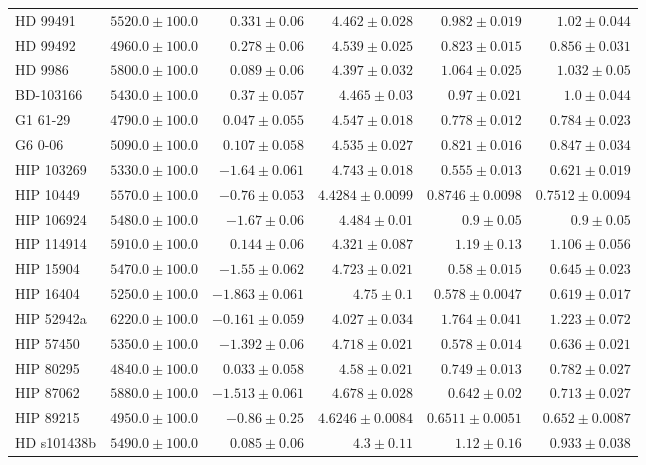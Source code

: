 \begin{longtable*}{lrrrrr}
HD 99491 & $5520.0\pm 100.0$ & $0.331\pm 0.06$ & $4.462\pm 0.028$ & $0.982\pm 0.019$ & $1.02\pm 0.044$ \\ 
HD 99492 & $4960.0\pm 100.0$ & $0.278\pm 0.06$ & $4.539\pm 0.025$ & $0.823\pm 0.015$ & $0.856\pm 0.031$ \\ 
HD 9986 & $5800.0\pm 100.0$ & $0.089\pm 0.06$ & $4.397\pm 0.032$ & $1.064\pm 0.025$ & $1.032\pm 0.05$ \\ 
BD-103166 & $5430.0\pm 100.0$ & $0.37\pm 0.057$ & $4.465\pm 0.03$ & $0.97\pm 0.021$ & $1.0\pm 0.044$ \\ 
G1 61-29 & $4790.0\pm 100.0$ & $0.047\pm 0.055$ & $4.547\pm 0.018$ & $0.778\pm 0.012$ & $0.784\pm 0.023$ \\ 
G6 0-06 & $5090.0\pm 100.0$ & $0.107\pm 0.058$ & $4.535\pm 0.027$ & $0.821\pm 0.016$ & $0.847\pm 0.034$ \\ 
HIP 103269 & $5330.0\pm 100.0$ & $-1.64\pm 0.061$ & $4.743\pm 0.018$ & $0.555\pm 0.013$ & $0.621\pm 0.019$ \\ 
HIP 10449 & $5570.0\pm 100.0$ & $-0.76\pm 0.053$ & $4.4284\pm 0.0099$ & $0.8746\pm 0.0098$ & $0.7512\pm 0.0094$ \\ 
HIP 106924 & $5480.0\pm 100.0$ & $-1.67\pm 0.06$ & $4.484\pm 0.01$ & $0.9\pm 0.05$ & $0.9\pm 0.05$ \\ 
HIP 114914 & $5910.0\pm 100.0$ & $0.144\pm 0.06$ & $4.321\pm 0.087$ & $1.19\pm 0.13$ & $1.106\pm 0.056$ \\ 
HIP 15904 & $5470.0\pm 100.0$ & $-1.55\pm 0.062$ & $4.723\pm 0.021$ & $0.58\pm 0.015$ & $0.645\pm 0.023$ \\ 
HIP 16404 & $5250.0\pm 100.0$ & $-1.863\pm 0.061$ & $4.75\pm 0.1$ & $0.578\pm 0.0047$ & $0.619\pm 0.017$ \\ 
HIP 52942a & $6220.0\pm 100.0$ & $-0.161\pm 0.059$ & $4.027\pm 0.034$ & $1.764\pm 0.041$ & $1.223\pm 0.072$ \\ 
HIP 57450 & $5350.0\pm 100.0$ & $-1.392\pm 0.06$ & $4.718\pm 0.021$ & $0.578\pm 0.014$ & $0.636\pm 0.021$ \\ 
HIP 80295 & $4840.0\pm 100.0$ & $0.033\pm 0.058$ & $4.58\pm 0.021$ & $0.749\pm 0.013$ & $0.782\pm 0.027$ \\ 
HIP 87062 & $5880.0\pm 100.0$ & $-1.513\pm 0.061$ & $4.678\pm 0.028$ & $0.642\pm 0.02$ & $0.713\pm 0.027$ \\ 
HIP 89215 & $4950.0\pm 100.0$ & $-0.86\pm 0.25$ & $4.6246\pm 0.0084$ & $0.6511\pm 0.0051$ & $0.652\pm 0.0087$ \\ 
HD s101438b & $5490.0\pm 100.0$ & $0.085\pm 0.06$ & $4.3\pm 0.11$ & $1.12\pm 0.16$ & $0.933\pm 0.038$ \\ 

\end{longtable*}
